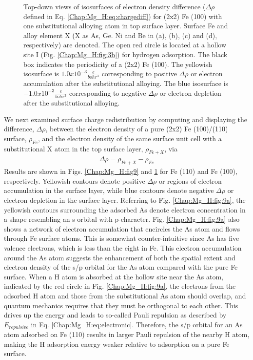 \begin{figure}[!ht]
\caption[Top-down views of isosurfaces of electron density difference for (2x2) Fe (100) with one substitutional alloying atom in top surface layer]{Top-down views of isosurfaces of electron density difference ($\Delta \rho$ defined in Eq. \ref{Chap:Mg_H:eq:chargediff}) for (2x2) Fe (100) with one substitutional alloying atom in top surface layer. Surface Fe and alloy element X (X as As, Ge. Ni and Be in (a), (b), (c) and (d), respectively) are denoted. The open red circle is located at a hollow site I (Fig. \ref{Chap:Mg_H:fig:3b}) for hydrogen adsorption. The black box indicates the periodicity of a (2x2) Fe (100). The yellowish isosurface is $1.0x10^{-3}\frac{e}{bohr^3}$ corresponding to positive $\Delta \rho$ or electron accumulation after the substitutional alloying. The blue isosurface is $-1.0x10^{-3}\frac{e}{bohr^3}$ corresponding to negative $\Delta \rho$ or electron depletion after the substitutional alloying.}
  \label{Chap:Mg_H:fig10}
\end{figure}
\endgroup

We next examined surface charge redistribution by computing and displaying the difference, $\Delta \rho$, between the electron density of a pure (2x2) Fe (100)/(110) surface, $\rho_{Fe}$, and the electron density of the same surface unit cell with a substitutional X atom in the top surface layer, $\rho_{Fe+X}$, via
\begin{align}
\Delta \rho = \rho_{Fe+ X} - \rho_{Fe}
\label{Chap:Mg_H:eq:chargediff}
\end{align}
Results are shown in Figs. \ref{Chap:Mg_H:fig9} and \ref{Chap:Mg_H:fig10} for Fe (110) and Fe (100), respectively. Yellowish contours denote positive $\Delta \rho$ or regions of electron accumulation in the surface layer, while blue contours denote negative $\Delta \rho$ or electron depletion in the surface layer. Referring to Fig. \ref{Chap:Mg_H:fig:9a}, the yellowish contours surrounding the adsorbed As denote electron concentration in a shape resembling an s orbital with p-character. Fig. \ref{Chap:Mg_H:fig:9a} also shows a network of electron accumulation that encircles the As atom and flows through Fe surface atoms. This is somewhat counter-intuitive since As has five valence electrons, which is less than the eight in Fe. This electron accumulation around the As atom suggests the enhancement of both the spatial extent and electron density of the s/p orbital for the As atom compared with the pure Fe surface. When a H atom is absorbed at the hollow site near the As atom, indicated by the red circle in Fig. \ref{Chap:Mg_H:fig:9a}, the electrons from the adsorbed H atom and those from the substitutional As atom should overlap, and quantum mechanics requires that they must be orthogonal to each other. This drives up the energy and leads to so-called Pauli repulsion as described by $E_{repulsive}$ in Eq. \ref{Chap:Mg_H:eq:electronic}. Therefore, the s/p orbital for an As atom adsorbed on Fe (110) results in larger Pauli repulsion of the nearby H atom, making the H adsorption energy weaker relative to adsorption on a pure Fe surface. 


